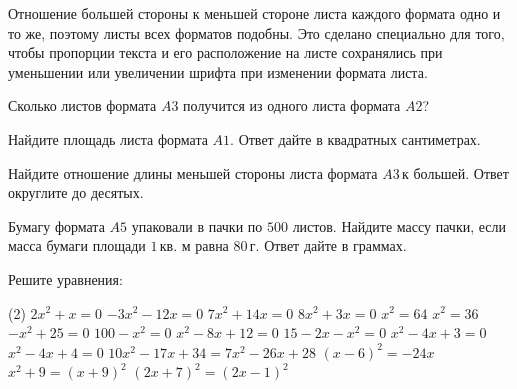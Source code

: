 \begin{class}[number=1]
\begin{listofex}
\begin{center}
		\end{center}
		Отношение большей стороны к меньшей стороне листа каждого формата одно и то же, поэтому листы всех форматов подобны. Это сделано специально для того, чтобы пропорции текста и его расположение на листе сохранялись при уменьшении или увеличении шрифта при изменении формата листа.
		\item Сколько листов формата \( A3 \) получится из одного листа формата \( A2 \)?
		\item Найдите площадь листа формата \( A1 \). Ответ дайте в квадратных сантиметрах.
		\item Найдите отношение длины меньшей стороны листа формата \( A3 \) к большей. Ответ округлите до десятых.
		\item Бумагу формата \( A5 \) упаковали в пачки по \( 500 \) листов. Найдите массу пачки, если масса бумаги площади \( 1 \) кв. м равна \( 80 \) г. Ответ дайте в граммах.
			\item Решите уравнения:
		\begin{tasks}(2)
			\task \( 2x^2+x=0 \)
			\task \( -3x^2-12x=0 \)
			\task \( 7x^2+14x=0 \)
			\task \( 8x^2+3x=0 \)
			\task \( x^2=64 \)
			\task \( x^2=36 \)
			\task \( -x^2+25=0 \)
			\task \( 100-x^2=0 \)
			\task \( x^2-8x+12=0 \)
			\task \( 15-2x-x^2=0 \)
			\task \( x^2-4x+3=0 \)
			\task \( x^2-4x+4=0 \)
			\task \( 10x^2-17x+34=7x^2-26x+28 \)
			\task \( (x-6)^2=-24x \)
			\task \( x^2+9=(x+9)^2 \)
			\task \( (2x+7)^2=(2x-1)^2 \)
		\end{tasks}
	\end{listofex}
\end{class}

